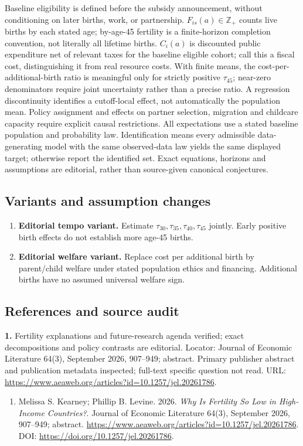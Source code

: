 \documentclass[11pt,a4paper]{article}
\begin{document}
Baseline eligibility is defined before the subsidy announcement, without conditioning on later births, work, or partnership. \(F_{is}(a)\in\mathbb Z_+\) counts live births by each stated age; by-age-45 fertility is a finite-horizon completion convention, not literally all lifetime births. \(C_i(a)\) is discounted public expenditure net of relevant taxes for the baseline eligible cohort; call this a fiscal cost, distinguishing it from real resource costs. With finite means, the cost-per-additional-birth ratio is meaningful only for strictly positive \(\tau_{45}\); near-zero denominators require joint uncertainty rather than a precise ratio. A regression discontinuity identifies a cutoff-local effect, not automatically the population mean. Policy assignment and effects on partner selection, migration and childcare capacity require explicit causal restrictions. All expectations use a stated baseline population and probability law. Identification means every admissible data-generating model with the same observed-data law yields the same displayed target; otherwise report the identified set. Exact equations, horizons and assumptions are editorial, rather than source-given canonical conjectures.
\subsection*{Variants and assumption changes}
\begin{enumerate}
\item \textbf{Editorial tempo variant.} Estimate \(\tau_{30},\tau_{35},\tau_{40},\tau_{45}\) jointly. Early positive birth effects do not establish more age-45 births.
\item \textbf{Editorial welfare variant.} Replace cost per additional birth by parent/child welfare under stated population ethics and financing. Additional births have no assumed universal welfare sign.
\end{enumerate}
\subsection*{References and source audit}
\textbf{1.} Fertility explanations and future-research agenda verified; exact decompositions and policy contrasts are editorial. Locator: Journal of Economic Literature 64(3), September 2026, 907–949; abstract. Primary publisher abstract and publication metadata inspected; full-text specific question not read. URL: \url{https://www.aeaweb.org/articles?id=10.1257/jel.20261786}.
\begin{enumerate}\raggedright
\item\hypertarget{definitions:source:30007738:1}{} Melissa S. Kearney; Phillip B. Levine. 2026. \emph{Why Is Fertility So Low in High-Income Countries?}. Journal of Economic Literature 64(3), September 2026, 907–949; abstract.
\url{https://www.aeaweb.org/articles?id=10.1257/jel.20261786}.
DOI: \url{https://doi.org/10.1257/jel.20261786}.
\end{enumerate}
\end{document}
